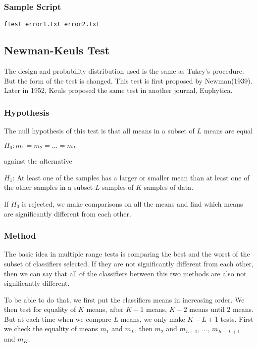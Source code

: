 \documentclass[a4paper,12pt]{book}
\begin{document}
\subsubsection{Sample Script}
\begin{verbatim}
ftest error1.txt error2.txt
\end{verbatim}

\subsection{Newman-Keuls Test}
The design and probability distribution used is the same as Tukey's procedure.
But the form of the test is changed. This test is first proposed by Newman(1939). Later in 1952, Keuls proposed the same test in another journal, Euphytica.

\subsubsection{Hypothesis}
The null hypothesis of this test is that all means in a subset of $L$ means are equal  
\begin{center}
$H_0: m_1=m_2=\ldots=m_L$
\end{center}
against the alternative
\begin{center}
$H_1$: At least one of the samples has a larger or smaller mean than at least one of the other
samples in a subset $L$ samples of $K$ samples of data.
\end{center}

If $H_0$ is rejected, we make comparisons on all the means and find which means are significantly different from each other.

\subsubsection{Method}
The basic idea in multiple range tests is comparing the best and the worst of the subset of classifiers selected. If they are not significantly different from each other, then we can say that all of the classifiers between this two methods are also not significantly different.

To be able to do that, we first put the classifiers means in increasing order. We then test for equality of $K$ means, after $K-1$ means, $K-2$ means until $2$ means. But at each time when we compare $L$ means, we only make $K-L+1$ tests. First we check the equality of means $m_1$ and $m_L$, then $m_2$ and $m_{L+1}$, $\ldots$, $m_{K-L+1}$ and $m_K$.
\end{document}
